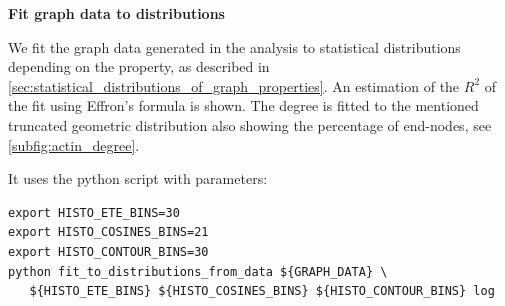 \textbf{Fit graph data to distributions}

We fit the graph data generated in the analysis to statistical distributions depending on the property, as described in \autoref{sec:statistical_distributions_of_graph_properties}.
An estimation of the $R^2$ of the fit using Effron's formula \cite{lindstrom_finite-strain_2013} is shown.
The degree is fitted to the mentioned truncated geometric distribution also showing the percentage of end-nodes, see \autoref{subfig:actin_degree}.

It uses the python script   \cite{phcerdan_fit_to_distribution_from_data_2018} with parameters:

\begin{verbatim}
export HISTO_ETE_BINS=30
export HISTO_COSINES_BINS=21
export HISTO_CONTOUR_BINS=30
python fit_to_distributions_from_data ${GRAPH_DATA} \
   ${HISTO_ETE_BINS} ${HISTO_COSINES_BINS} ${HISTO_CONTOUR_BINS} log
\end{verbatim}

